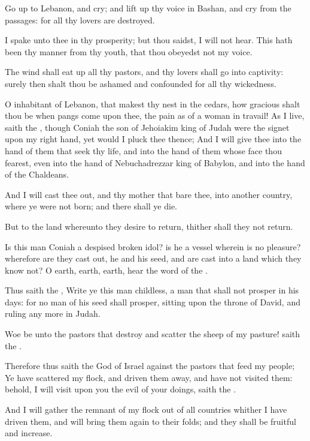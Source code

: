 \Verse Go up to Lebanon, and cry; and lift up thy voice in Bashan, and cry from the passages: for all thy lovers are destroyed.

\Verse I spake unto thee in thy prosperity; but thou saidst, I will not hear. This hath been thy manner from thy youth, that thou obeyedst not my voice.

\Verse The wind shall eat up all thy pastors, and thy lovers shall go into captivity: surely then shalt thou be ashamed and confounded for all thy wickedness.

\Verse O inhabitant of Lebanon, that makest thy nest in the cedars, how gracious shalt thou be when pangs come upon thee, the pain as of a woman in travail!  \Verse As I live, saith the \LORD, though Coniah the son of Jehoiakim king of Judah were the signet upon my right hand, yet would I pluck thee thence; \Verse And I will give thee into the hand of them that seek thy life, and into the hand of them whose face thou fearest, even into the hand of Nebuchadrezzar king of Babylon, and into the hand of the Chaldeans.

\Verse And I will cast thee out, and thy mother that bare thee, into another country, where ye were not born; and there shall ye die.

\Verse But to the land whereunto they desire to return, thither shall they not return.

\Verse Is this man Coniah a despised broken idol? is he a vessel wherein is no pleasure? wherefore are they cast out, he and his seed, and are cast into a land which they know not?  \Verse O earth, earth, earth, hear the word of the \LORD.

\Verse Thus saith the \LORD, Write ye this man childless, a man that shall not prosper in his days: for no man of his seed shall prosper, sitting upon the throne of David, and ruling any more in Judah.


\Chapter
\Verse Woe be unto the pastors that destroy and scatter the sheep of my pasture! saith the \LORD.

\Verse Therefore thus saith the \LORD God of Israel against the pastors that feed my people; Ye have scattered my flock, and driven them away, and have not visited them: behold, I will visit upon you the evil of your doings, saith the \LORD.

\Verse And I will gather the remnant of my flock out of all countries whither I have driven them, and will bring them again to their folds; and they shall be fruitful and increase.


